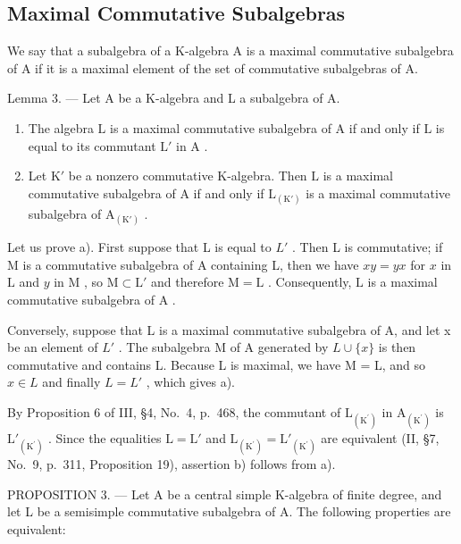 \subsection{Maximal Commutative Subalgebras}

We say that a subalgebra of a K-algebra A is a maximal commutative subalgebra of A if it is a maximal element of the set of commutative subalgebras of A.

Lemma 3. --- Let A be a K-algebra and L a subalgebra of A.

\begin{enumerate}
\def\labelenumi{\alph{enumi})}
\item
  The algebra \(\mathrm{L}\) is a maximal commutative subalgebra of \(\mathrm{A}\) if and only if \(\mathrm{L}\) is equal to its commutant \(\mathrm{L}'\) in \(\mathrm{A}\) .
\item
  Let \(\mathrm{K}'\) be a nonzero commutative K-algebra. Then \(\mathrm{L}\) is a maximal commutative subalgebra of A if and only if \(\mathrm{L}_{(\mathrm{K}')}\) is a maximal commutative subalgebra of \(\mathrm{A}_{(\mathrm{K}')}\) .
\end{enumerate}

Let us prove a). First suppose that L is equal to \(L'\) . Then L is commutative; if M is a commutative subalgebra of A containing L, then we have \(xy = yx\) for \(x\) in \(\mathrm{L}\) and \(y\) in \(\mathrm{M}\) , so \(\mathrm{M} \subset \mathrm{L}'\) and therefore \(\mathrm{M} = \mathrm{L}\) . Consequently, \(\mathrm{L}\) is a maximal commutative subalgebra of \(\mathrm{A}\) .

Conversely, suppose that L is a maximal commutative subalgebra of A, and let x be an element of \(L'\) . The subalgebra M of A generated by \(L \cup \{x\}\) is then commutative and contains L. Because L is maximal, we have M = L, and so \(x \in L\) and finally \(L = L'\) , which gives a).

By Proposition 6 of III, §4, No.~4, p.~468, the commutant of \(\mathrm{L}_{(\mathrm{K}^{\prime})}\) in \(\mathrm{A}_{(\mathrm{K}^{\prime})}\) is \(\mathrm{L}'_{(\mathrm{K}^{\prime})}\) . Since the equalities \(\mathrm{L} = \mathrm{L}'\) and \(\mathrm{L}_{(\mathrm{K}^{\prime})} = \mathrm{L}'_{(\mathrm{K}^{\prime})}\) are equivalent (II, §7, No.~9, p.~311, Proposition 19), assertion b) follows from a).

PROPOSITION 3. --- Let A be a central simple K-algebra of finite degree, and let L be a semisimple commutative subalgebra of A. The following properties are equivalent:

